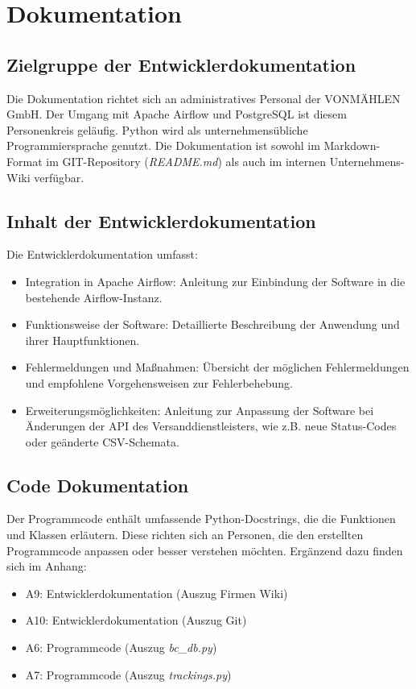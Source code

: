 \section{Dokumentation}
\label{sec:Dokumentation}


\subsection{Zielgruppe der Entwicklerdokumentation}
\label{sec:ZielgruppeDoku}

Die Dokumentation richtet sich an administratives Personal der VONMÄHLEN GmbH. 
Der Umgang mit Apache Airflow und PostgreSQL ist diesem Personenkreis geläufig. 
Python wird als unternehmensübliche Programmiersprache genutzt. Die Dokumentation ist 
sowohl im Markdown-Format im GIT-Repository (\textit{README.md}) als auch im internen Unternehmens-Wiki verfügbar.

\subsection{Inhalt der Entwicklerdokumentation}
\label{sec:Entwicklerdokumentation}

Die Entwicklerdokumentation umfasst:
\begin{itemize}
    \item Integration in Apache Airflow: Anleitung zur Einbindung der Software in die bestehende Airflow-Instanz.
    \item Funktionsweise der Software: Detaillierte Beschreibung der Anwendung und ihrer Hauptfunktionen.
    \item Fehlermeldungen und Maßnahmen: Übersicht der möglichen Fehlermeldungen und empfohlene Vorgehensweisen zur Fehlerbehebung.
    \item Erweiterungsmöglichkeiten: Anleitung zur Anpassung der Software bei Änderungen der API des Versanddienstleisters, 
    wie z.B. neue Status-Codes oder geänderte CSV-Schemata.
\end{itemize}


\subsection{Code Dokumentation}
\label{sec:CodeDokumentation}

Der Programmcode enthält umfassende Python-Docstrings, die die Funktionen und Klassen erläutern. 
Diese richten sich an Personen, die den erstellten Programmcode anpassen oder besser verstehen möchten. 
Ergänzend dazu finden sich im Anhang:
\begin{itemize}
    \item A9: Entwicklerdokumentation (Auszug Firmen Wiki)
    \item A10: Entwicklerdokumentation (Auszug Git)
    \item A6: Programmcode (Auszug \textit{bc\_db.py})
    \item A7: Programmcode (Auszug \textit{trackings.py})
\end{itemize}

\clearpage